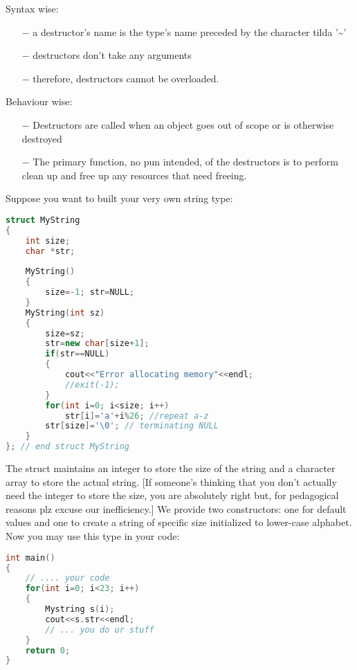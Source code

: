 \documentclass[11pt,fleqn]{book} %
\begin{document}
\noindent Syntax wise:
\begin{itemize}
	\item[$-$] a destructor's name is the type's name preceded by the character tilda '\textasciitilde'
	\item[$-$] destructors don't take any arguments
	\item[$-$] therefore, destructors cannot be overloaded.
\end{itemize}

\noindent Behaviour wise:
\begin{itemize}
	\item[$-$] Destructors are called when an object goes out of scope or is otherwise destroyed
	\item[$-$] The primary function, no pun intended, of the destructors is to perform clean up and free up any resources that need freeing.
\end{itemize}
Suppose you want to built your very own string type:
\begin{lstlisting}[language=C++, caption = struct MyString]
struct MyString 
{
	int size;
	char *str;
	
	MyString()
	{
		size=-1; str=NULL;
	} 
	MyString(int sz)
	{
		size=sz;
		str=new char[size+1];
		if(str==NULL)
		{
			cout<<"Error allocating memory"<<endl;
			//exit(-1);
		} 
		for(int i=0; i<size; i++)
			str[i]='a'+i%26; //repeat a-z
		str[size]='\0'; // terminating NULL
	}
}; // end struct MyString
\end{lstlisting}

The struct maintains an integer to store the size of the string and a character array to store the actual string. [If someone's thinking that you don't actually need the integer to store the size, you are absolutely right but, for pedagogical reasons plz excuse our inefficiency.] We provide two constructors: one for default values and one to create a string of specific size initialized to lower-case alphabet. Now you may use this type in your code:
\begin{lstlisting}[language=C++, caption = Use MyString in main()]
int main() 
{
	// .... your code
	for(int i=0; i<23; i++)
	{
		Mystring s(i);
		cout<<s.str<<endl;
		// ... you do ur stuff
	}
	return 0;
}
\end{lstlisting}
\end{document}
